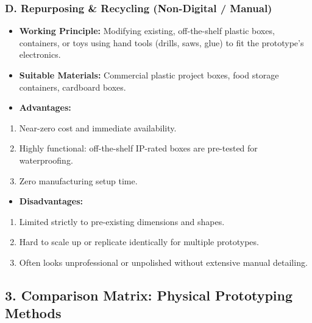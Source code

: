 \subsubsection{D. Repurposing \& Recycling (Non-Digital / Manual)}
\begin{itemize}
  \item   \textbf{Working Principle:} Modifying existing, off-the-shelf plastic boxes, containers, or toys using hand tools (drills, saws, glue) to fit the prototype's electronics.
  \item   \textbf{Suitable Materials:} Commercial plastic project boxes, food storage containers, cardboard boxes.
  \item   \textbf{Advantages:}
\end{itemize}
\begin{enumerate}
  \item Near-zero cost and immediate availability.
  \item Highly functional: off-the-shelf IP-rated boxes are pre-tested for waterproofing.
  \item Zero manufacturing setup time.
\end{enumerate}
\begin{itemize}
  \item   \textbf{Disadvantages:}
\end{itemize}
\begin{enumerate}
  \item Limited strictly to pre-existing dimensions and shapes.
  \item Hard to scale up or replicate identically for multiple prototypes.
  \item Often looks unprofessional or unpolished without extensive manual detailing.
\end{enumerate}


\subsection{3. Comparison Matrix: Physical Prototyping Methods}

